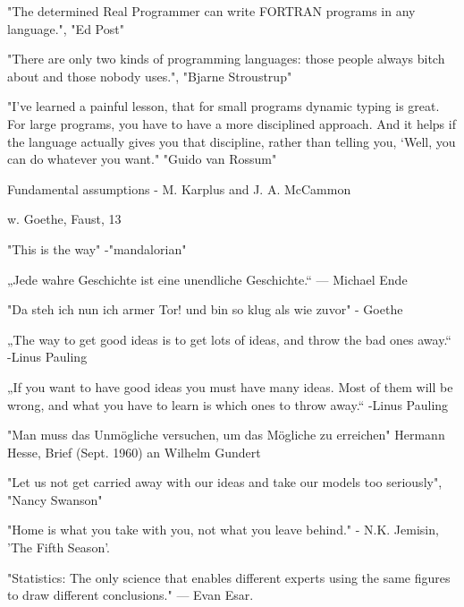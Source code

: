 "The determined Real Programmer can write FORTRAN programs in any language.", "Ed Post"

"There are only two kinds of programming languages: those people always bitch about and those nobody uses.",
          "Bjarne Stroustrup" 
          
 "I’ve learned a painful lesson, that for small programs dynamic typing is great. For large programs, you have to have a more disciplined approach. And it helps if the language actually gives you that discipline, rather than telling you, ‘Well, you can do whatever you want." "Guido van Rossum"         
          
{Fundamental assumptions - M. Karplus  and J. A. McCammon \cite{Karplus2002}}




{w. Goethe, Faust, 13 }

"This is the way" -"mandalorian"

„Jede wahre Geschichte ist eine unendliche Geschichte.“ — Michael Ende

"Da steh ich nun ich armer Tor! und bin so klug als wie zuvor" - Goethe




„The way to get good ideas is to get lots of ideas, and throw the bad ones away.“
-Linus Pauling

„If you want to have good ideas you must have many ideas. Most of them will be wrong, and what you have to learn is which ones to throw away.“
-Linus Pauling

"Man muss das Unmögliche versuchen, um das Mögliche zu erreichen"
Hermann Hesse, Brief (Sept. 1960) an Wilhelm Gundert

"Let us not get carried away with our ideas and take our models too seriously",
          "Nancy Swanson"
          
"Home is what you take with you, not what you leave behind."
- N.K. Jemisin, 'The Fifth Season'.


 "Statistics: The only science that enables different experts using the same figures to draw different conclusions."
— Evan Esar.
